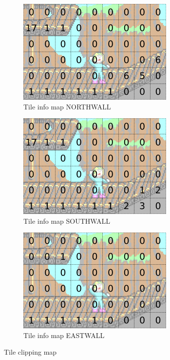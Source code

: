 \documentclass[book.tex]{subfiles}
\begin{document}
\begin{figure}
\centering
\begin{subfigure}{.33\textwidth}
  \centering
  \includegraphics[width=.9\textwidth]{screenshots_300dpi/game/clip_tinf_1.png}
  \caption{Tile info map NORTHWALL}
  \label{fig:clip_tinf_n}
\end{subfigure}%
\begin{subfigure}{.33\textwidth}
  \centering
  \includegraphics[width=.9\textwidth]{screenshots_300dpi/game/clip_tinf_south.png}
  \caption{Tile info map SOUTHWALL}
  \label{fig:clip_tinf_s}
\end{subfigure}
\begin{subfigure}{.33\textwidth}
  \centering
  \includegraphics[width=.9\textwidth]{screenshots_300dpi/game/clip_tinf_east.png}
  \caption{Tile info map EASTWALL}
  \label{fig:clip_tinf_e}
\end{subfigure}
\caption{Tile clipping map}
\label{fig:clip_tinf}
\end{figure}
\end{document}
